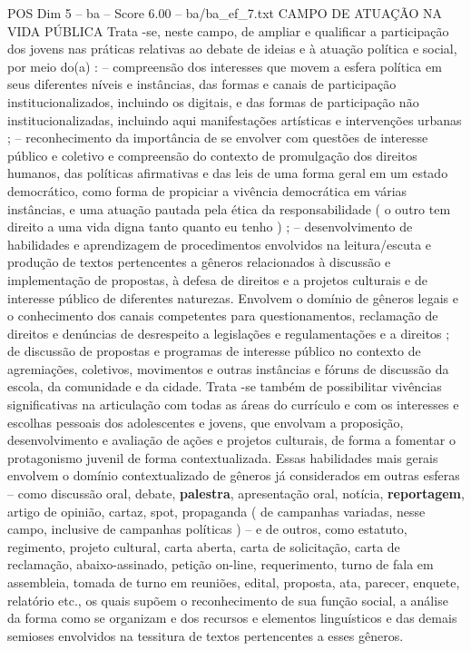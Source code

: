 \begin{textsample}{POS Dim 5 – ba – Score 6.00 – ba/ba\_ef\_7.txt}
CAMPO DE ATUAÇÃO NA VIDA PÚBLICA Trata -se, neste campo, de ampliar e qualificar a participação dos jovens nas práticas relativas ao debate de ideias e à atuação política e social, por meio do(a) : – compreensão dos interesses que movem a esfera política em seus diferentes níveis e instâncias, das formas e canais de participação institucionalizados, incluindo os digitais, e das formas de participação não institucionalizadas, incluindo aqui manifestações artísticas e intervenções urbanas ; – reconhecimento da importância de se envolver com questões de interesse público e coletivo e compreensão do contexto de promulgação dos direitos humanos, das políticas afirmativas e das leis de uma forma geral em um estado democrático, como forma de propiciar a vivência democrática em várias instâncias, e uma atuação pautada pela ética da responsabilidade ( o outro tem direito a uma vida digna tanto quanto eu tenho ) ; – desenvolvimento de habilidades e aprendizagem de procedimentos envolvidos na leitura/escuta e produção de textos pertencentes a gêneros relacionados à discussão e implementação de propostas, à defesa de direitos e a projetos culturais e de interesse público de diferentes naturezas.
Envolvem o domínio de gêneros legais e o conhecimento dos canais competentes para questionamentos, reclamação de direitos e denúncias de desrespeito a legislações e regulamentações e a direitos ; de discussão de propostas e programas de interesse público no contexto de agremiações, coletivos, movimentos e outras instâncias e fóruns de discussão da escola, da comunidade e da cidade.
Trata -se também de possibilitar vivências significativas na articulação com todas as áreas do currículo e com os interesses e escolhas pessoais dos adolescentes e jovens, que envolvam a proposição, desenvolvimento e avaliação de ações e projetos culturais, de forma a fomentar o protagonismo juvenil de forma contextualizada.
Essas habilidades mais gerais envolvem o domínio contextualizado de gêneros já considerados em outras esferas – como discussão oral, debate, \textbf{palestra}, apresentação oral, notícia, \textbf{reportagem}, artigo de opinião, cartaz, spot, propaganda ( de campanhas variadas, nesse campo, inclusive de campanhas políticas ) – e de outros, como estatuto, regimento, projeto cultural, carta aberta, carta de solicitação, carta de reclamação, abaixo-assinado, petição on-line, requerimento, turno de fala em assembleia, tomada de turno em reuniões, edital, proposta, ata, parecer, enquete, relatório etc., os quais supõem o reconhecimento de sua função social, a análise da forma como se organizam e dos recursos e elementos linguísticos e das demais semioses envolvidos na tessitura de textos pertencentes a esses gêneros.

\end{textsample}
